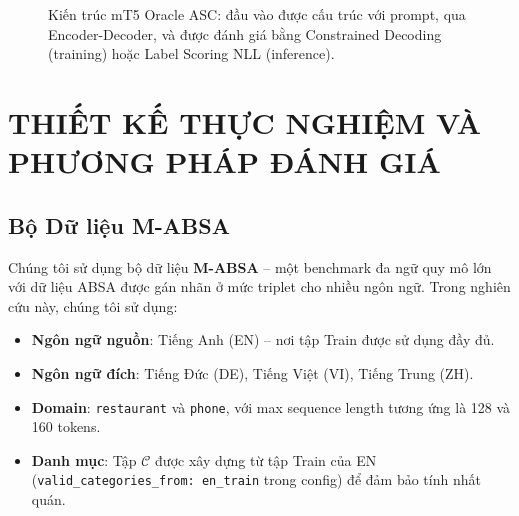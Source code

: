 \documentclass[12pt,a4paper,oneside]{report}
\begin{document}
\begin{figure}[ht]
{
}
\caption{Kiến trúc mT5 Oracle ASC: đầu vào được cấu trúc với prompt, qua Encoder-Decoder, và được đánh giá bằng Constrained Decoding (training) hoặc Label Scoring NLL (inference).}
\label{fig:mt5_full}
\end{figure}


\chapter{THIẾT KẾ THỰC NGHIỆM VÀ PHƯƠNG PHÁP ĐÁNH GIÁ}

\section{Bộ Dữ liệu M-ABSA}

Chúng tôi sử dụng bộ dữ liệu \textbf{M-ABSA} -- một benchmark đa ngữ quy mô lớn với dữ liệu ABSA được gán nhãn ở mức triplet cho nhiều ngôn ngữ. Trong nghiên cứu này, chúng tôi sử dụng:
\begin{itemize}
    \item \textbf{Ngôn ngữ nguồn}: Tiếng Anh (EN) -- nơi tập Train được sử dụng đầy đủ.
    \item \textbf{Ngôn ngữ đích}: Tiếng Đức (DE), Tiếng Việt (VI), Tiếng Trung (ZH).
    \item \textbf{Domain}: \texttt{restaurant} và \texttt{phone}, với max sequence length tương ứng là 128 và 160 tokens.
    \item \textbf{Danh mục}: Tập $\mathcal{C}$ được xây dựng từ tập Train của EN (\texttt{valid\_categories\_from: en\_train} trong config) để đảm bảo tính nhất quán.
\end{itemize}
\end{document}
